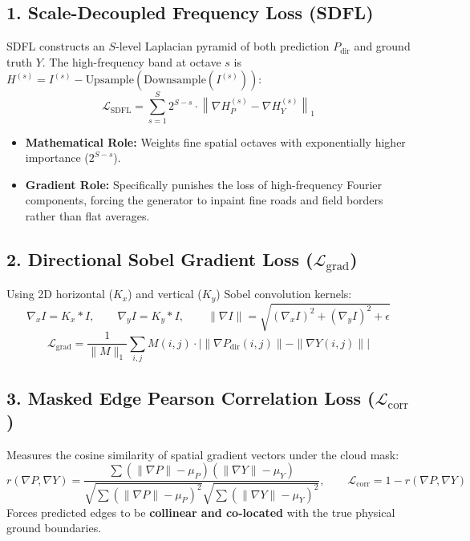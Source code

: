\documentclass[11pt,a4paper]{article}
\begin{document}
\subsection{1. Scale-Decoupled Frequency Loss (SDFL)}
SDFL constructs an $S$-level Laplacian pyramid of both prediction $P_{\text{dir}}$ and ground truth $Y$. The high-frequency band at octave $s$ is $H^{(s)} = I^{(s)} - \text{Upsample}(\text{Downsample}(I^{(s)}))$:
\begin{equation}
\mathcal{L}_{\text{SDFL}} = \sum_{s=1}^S 2^{S-s} \cdot \left\| \nabla H_P^{(s)} - \nabla H_Y^{(s)} \right\|_1
\end{equation}
\begin{itemize}[leftmargin=1.5em, itemsep=0.2em]
    \item \textbf{Mathematical Role:} Weights fine spatial octaves with exponentially higher importance ($2^{S-s}$).
    \item \textbf{Gradient Role:} Specifically punishes the loss of high-frequency Fourier components, forcing the generator to inpaint fine roads and field borders rather than flat averages.
\end{itemize}

\subsection{2. Directional Sobel Gradient Loss ($\mathcal{L}_{\text{grad}}$)}
Using 2D horizontal ($K_x$) and vertical ($K_y$) Sobel convolution kernels:
\begin{equation}
\nabla_x I = K_x * I, \qquad \nabla_y I = K_y * I, \qquad \|\nabla I\| = \sqrt{(\nabla_x I)^2 + (\nabla_y I)^2 + \epsilon}
\end{equation}
\begin{equation}
\mathcal{L}_{\text{grad}} = \frac{1}{\|M\|_1} \sum_{i, j} M(i, j) \cdot \left| \|\nabla P_{\text{dir}}(i, j)\| - \|\nabla Y(i, j)\| \right|
\end{equation}

\subsection{3. Masked Edge Pearson Correlation Loss ($\mathcal{L}_{\text{corr}}$)}
Measures the cosine similarity of spatial gradient vectors under the cloud mask:
\begin{equation}
r(\nabla P, \nabla Y) = \frac{\sum (\|\nabla P\| - \mu_P)(\|\nabla Y\| - \mu_Y)}{\sqrt{\sum (\|\nabla P\| - \mu_P)^2} \sqrt{\sum (\|\nabla Y\| - \mu_Y)^2}}, \qquad \mathcal{L}_{\text{corr}} = 1 - r(\nabla P, \nabla Y)
\end{equation}
Forces predicted edges to be \textbf{collinear and co-located} with the true physical ground boundaries.
\end{document}
